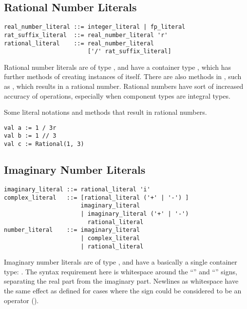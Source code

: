 \subsection{Rational Number Literals}
\label{sec:rationalliterals}

\syntax\begin{lstlisting}
real_number_literal ::= integer_literal | fp_literal
rat_suffix_literal  ::= real_number_literal 'r'
rational_literal    ::= real_number_literal 
                        ['/' rat_suffix_literal]
\end{lstlisting}

Rational number literals are of type , and have a container type , which has further methods of creating instances of itself. There are also methods in , such as \code{//}, which results in a rational number. Rational numbers have sort of increased accuracy of operations, especially when component types are integral types. 

\example Some literal notations and methods that result in rational numbers. 
\begin{lstlisting}
val a := 1 / 3r
val b := 1 // 3
val c := Rational(1, 3)
\end{lstlisting}





\subsection{Imaginary Number Literals}
\label{sec:imaginaryliterals}

\syntax\begin{lstlisting}
imaginary_literal ::= rational_literal 'i'
complex_literal   ::= [rational_literal ('+' | '-') ]
                      imaginary_literal
	                  | imaginary_literal ('+' | '-') 
	                    rational_literal
number_literal    ::= imaginary_literal
	                  | complex_literal
	                  | rational_literal
\end{lstlisting}

Imaginary number literals are of type , and have a basically a single container type: . The syntax requirement here is whitespace around the ``\code{+}'' and ``\code{-}'' signs, separating the real part from the imaginary part. Newlines as whitespace have the same effect as defined for cases where the sign could be considered to be an operator ().





